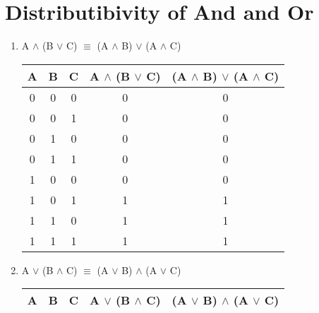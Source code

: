 \documentclass{report}
\begin{document}
\section{Distributibivity of And and Or}

\begin{enumerate}



  \item A $\land$ (B $\lor$ C) $\equiv$ (A $\land$ B) $\lor$ (A $\land$ C)



\begin{center}

  \begin{tabular}{| c | c | c | c | c |}

    \hline

    A & B & C & A $\land$ (B $\lor$ C) & (A $\land$ B) $\lor$ (A $\land$ C) \\ \hline

    0 & 0 & 0 & 0 & 0 \\

    0 & 0 & 1 & 0 & 0 \\

    0 & 1 & 0 & 0 & 0 \\

    0 & 1 & 1 & 0 & 0 \\

    1 & 0 & 0 & 0 & 0 \\

    1 & 0 & 1 & 1 & 1 \\

    1 & 1 & 0 & 1 & 1 \\

    1 & 1 & 1 & 1 & 1 \\ \hline

  \end{tabular}

\end{center}



  \item A $\lor$ (B $\land$ C) $\equiv$ (A $\lor$ B) $\land$ (A $\lor$ C)



\begin{center}

  \begin{tabular}{| c | c | c | c | c |}

    \hline

    A & B & C & A $\lor$ (B $\land$ C) & (A $\lor$ B) $\land$ (A $\lor$ C) \\ \hline


\end{tabular}
\end{center}
\end{enumerate}
\end{document}
